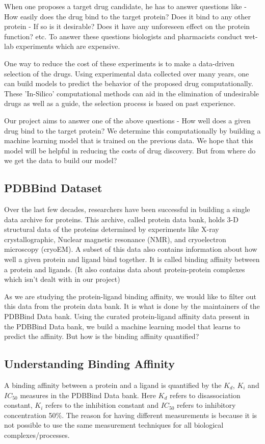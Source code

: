 \documentclass[11pt]{article}
\begin{document}
When one proposes a target drug candidate, he has to answer questions
like - How easily does the drug bind to the target protein?
Does it bind to any other protein - If so is it desirable?
Does it have any unforeseen effect on the protein function?
etc.
To answer these questions biologists and pharmacists conduct wet-lab experiments which are expensive.

One way to reduce the cost of these experiments is to make a data-driven selection of the drugs.
Using experimental data collected over many years, one can build models to predict the
behavior of the proposed drug computationally.
These 'In-Silico' computational methods can aid in the elimination of undesirable drugs as well
as a guide, the selection process is based on past experience.

Our project aims to answer one of the above questions - How well does a given drug bind to the target protein?
We determine this computationally by building a machine learning model that is trained on the previous data.
We hope that this model will be helpful in reducing the costs of drug discovery.
But from where do we get the data to build our model?

\subsection{PDBBind Dataset}
Over the last few decades, researchers have been successful in building a single data archive for proteins.
This archive, called protein data bank, holds 3-D structural data of the proteins determined by experiments
like X-ray crystallographic, Nuclear magnetic resonance (NMR), and cryoelectron microscopy (cryoEM).
A subset of this data also contains information about how well a given protein and ligand bind together.
It is called binding affinity between a protein and ligands.
(It also contains data about protein-protein complexes which isn't dealt with in our project)
\cite{pdbank_history}

As we are studying the protein-ligand binding affinity, we would like to filter out this data
from the protein data bank.
It is what is done by the maintainers of the PDBBind Data bank.
\cite{pdbbind_introduction}
Using the curated protein-ligand affinity data present in the PDBBind Data bank, we build a machine learning model that learns to predict the affinity.
But how is the binding affinity quantified?

\subsection{Understanding Binding Affinity}
A binding affinity between a protein and a ligand is quantified by the $K_d$, $K_i$ and $IC_{50}$ measures in the PDBBind Data bank.
Here $K_d$ refers to disassociation constant, $K_i$ refers to the inhibition constant and $IC_{50}$ refers to 
inhibitory concentration 50\%.
The reason for having different measurements is because it is not possible to use the same measurement techniques
for all biological complexes/processes.
\end{document}
